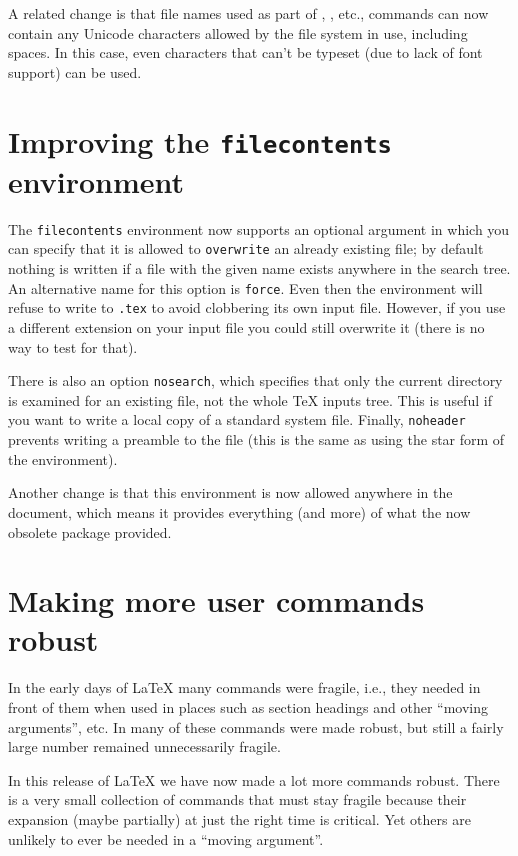 \documentclass{ltnews}
\providecommand\option[1]{\texttt{#1}}
\providecommand\env[1]{\texttt{#1}}
\providecommand\env[1]{\texttt{#1}}
\begin{document}
A related change is that file names used as part of ,
, etc., commands 
can now contain any 
Unicode characters allowed by the file system in use,  
including spaces. 
In this case, 
 even characters that can't be typeset 
(due to lack of font support) can be used.


\section{Improving the \env{filecontents} environment}

The \env{filecontents} environment now supports an optional argument
in which you can specify that it is allowed to \option{overwrite} an
already existing file;  
 by default nothing is written if a file with the given name 
exists anywhere in the search tree. An alternative name for this
option is \texttt{force}.  
Even then the environment will refuse to write
to \texttt{.tex} to avoid clobbering its own input
file. However, if you use a different extension on your input file you
could still overwrite it (there is no way to test for that).

There is also an
option 
\option{nosearch}, 
which specifies that only the current directory is
examined for an existing file, not the whole \TeX{} inputs tree. 
This is useful if you want to write a
local copy of a standard system file.
Finally, \option{noheader} prevents writing a preamble to the file 
(this  
is the same as using the star form of the environment).

Another change is that this 
environment is 
now allowed anywhere in the document, 
which means
it provides everything (and more) of what the now obsolete 
 package provided.



\section{Making more user commands robust}

In the early days of \LaTeX{} many commands were fragile, i.e., they
needed  in front of them when used in places such as
section headings and other \enquote{moving arguments}, etc. 
In \LaTeXe{} many of these commands were made robust,  
but still a fairly large number remained unnecessarily fragile.

In this release of \LaTeX{} we have now 
made a lot more commands robust.
There is a very small collection of commands that must stay fragile  
because their expansion (maybe partially) at just the right time is critical.
Yet others are unlikely to ever be needed in a \enquote{moving argument}.
\end{document}
